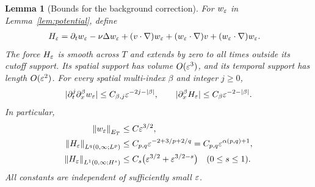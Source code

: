 \documentclass[11pt,a4paper]{article}
\newtheorem{lemma}[theorem]{Lemma}
\theoremstyle{definition}\newtheorem{definition}[theorem]{Definition}
\theoremstyle{remark}\newtheorem{remark}[theorem]{Remark}
\newcommand{\norm}[1]{\left\lVert#1\right\rVert}
\begin{document}
\begin{lemma}[Bounds for the background correction]\label{lem:correction}
For $w_\varepsilon$ in Lemma~\ref{lem:potential}, define
\begin{align}
 H_\varepsilon={}&\partial_tw_\varepsilon-\nu\Delta w_\varepsilon
 +(v\cdot\nabla)w_\varepsilon+(w_\varepsilon\cdot\nabla)v
 +(w_\varepsilon\cdot\nabla)w_\varepsilon.\label{eq:H}
\end{align}
The force $H_\varepsilon$ is smooth across $T$ and extends by zero to all times outside its cutoff support. Its spatial support has volume $O(\varepsilon^3)$, and its temporal support has length $O(\varepsilon^2)$. For every spatial multi-index $\beta$ and integer $j\ge0$,
\begin{equation}\label{eq:derivativebounds}
 |\partial_t^j\partial_x^\beta w_\varepsilon|
 \le C_{\beta,j}\varepsilon^{-2j-|\beta|},\qquad
 |\partial_x^\beta H_\varepsilon|
 \le C_\beta\varepsilon^{-2-|\beta|}.
\end{equation}
In particular,
\begin{align}
 \norm{w_\eps}_{E_T}&\le C\eps^{3/2},\label{eq:wE}\\
 \norm{H_\eps}_{L^q(0,\infty;L^p)}
   &\le C_{p,q}\eps^{-2+3/p+2/q}
     =C_{p,q}\eps^{\alpha(p,q)+1},\label{eq:Hmixed}\\
 \norm{H_\eps}_{L^1(0,\infty;H^s)}
   &\le C_s\bigl(\eps^{3/2}+\eps^{3/2-s}\bigr)
       \quad(0\le s\le1).\label{eq:HHs}
\end{align}
All constants are independent of sufficiently small $\varepsilon$.
\end{lemma}
\end{document}
